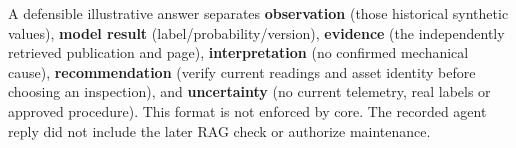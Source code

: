 A defensible illustrative answer separates \textbf{observation} (those historical synthetic values), \textbf{model result} (label/probability/version), \textbf{evidence} (the independently retrieved publication and page), \textbf{interpretation} (no confirmed mechanical cause), \textbf{recommendation} (verify current readings and asset identity before choosing an inspection), and \textbf{uncertainty} (no current telemetry, real labels or approved procedure). This format is not enforced by core. The recorded agent reply did not include the later RAG check or authorize maintenance.

